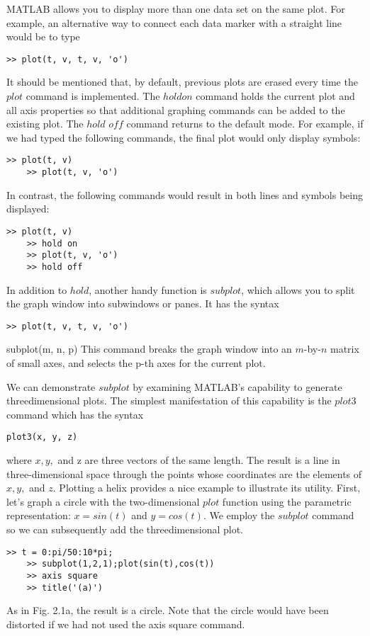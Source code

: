 \documentclass[../main.tex]{subfiles}
\begin{document}
MATLAB allows you to display more than one data set on the same plot. For example,
an alternative way to connect each data marker with a straight line would be to type
\begin{lstlisting}[frame=none, numbers=none]
	>> plot(t, v, t, v, 'o')
\end{lstlisting}

It should be mentioned that, by default, previous plots are erased every time the $plot$
command is implemented. The $hold on$ command holds the current plot and all axis properties 
so that additional graphing commands can be added to the existing plot. The $hold$
$off$ command returns to the default mode. For example, if we had typed the following
commands, the final plot would only display symbols:
\begin{lstlisting}[frame=none, numbers=none]
	>> plot(t, v)
	>> plot(t, v, 'o')
\end{lstlisting}


In contrast, the following commands would result in both lines and symbols being displayed:
\begin{lstlisting}[frame=none, numbers=none]
	>> plot(t, v)
	>> hold on
	>> plot(t, v, 'o')
	>> hold off
\end{lstlisting}
In addition to $hold$, another handy function is $subplot$, which allows you to split the
graph window into subwindows or panes. It has the syntax
\begin{lstlisting}[frame=none, numbers=none]
	>> plot(t, v, t, v, 'o')
\end{lstlisting}subplot(m, n, p)
This command breaks the graph window into an $m$-by-$n$ matrix of small axes, and selects
the p-th axes for the current plot.


We can demonstrate $subplot$ by examining MATLAB’s capability to generate threedimensional plots. The simplest
 manifestation of this capability is the $plot3$ command
which has the syntax
\begin{lstlisting}[frame=none, numbers=none]
	plot3(x, y, z)
\end{lstlisting}
where $x, y,$ and z are three vectors of the same length. The result is a line in three-dimensional
space through the points whose coordinates are the elements of $x, y,$ and $z.$
Plotting a helix provides a nice example to illustrate its utility. First, let’s graph a circle
with the two-dimensional $plot$ function using the parametric representation: $x = sin(t)$
and $y = cos(t)$. We employ the $subplot$ command so we can subsequently add the threedimensional plot.
\begin{lstlisting}[frame=none, numbers=none]
	>> t = 0:pi/50:10*pi;
	>> subplot(1,2,1);plot(sin(t),cos(t))
	>> axis square
	>> title('(a)')
\end{lstlisting}
As in Fig. 2.1a, the result is a circle. Note that the circle would have been distorted if we
had not used the axis square command.
\end{document}
